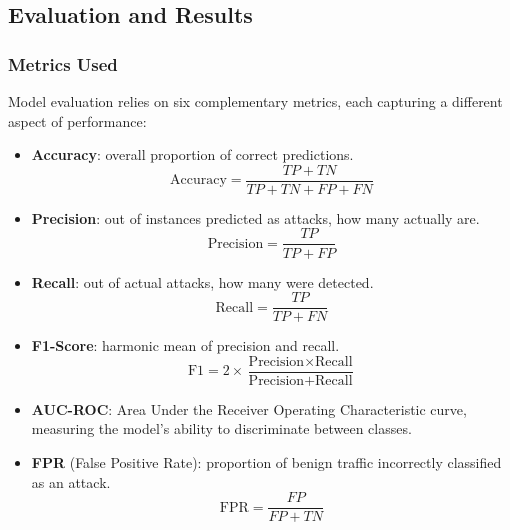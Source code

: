 \subsection{Evaluation and Results}

\subsubsection{Metrics Used}

Model evaluation relies on six complementary metrics, each capturing a different aspect of performance:

\begin{itemize}
    \item \textbf{Accuracy}: overall proportion of correct predictions.
    \begin{equation}
        \text{Accuracy} = \frac{TP + TN}{TP + TN + FP + FN}
    \end{equation}

    \item \textbf{Precision}: out of instances predicted as attacks, how many actually are.
    \begin{equation}
        \text{Precision} = \frac{TP}{TP + FP}
    \end{equation}

    \item \textbf{Recall}: out of actual attacks, how many were detected.
    \begin{equation}
        \text{Recall} = \frac{TP}{TP + FN}
    \end{equation}

    \item \textbf{F1-Score}: harmonic mean of precision and recall.
    \begin{equation}
        \text{F1} = 2 \times \frac{\text{Precision} \times \text{Recall}}{\text{Precision} + \text{Recall}}
    \end{equation}

    \item \textbf{AUC-ROC}: Area Under the Receiver Operating Characteristic curve, measuring the model's ability to discriminate between classes.

    \item \textbf{FPR} (False Positive Rate): proportion of benign traffic incorrectly classified as an attack.
    \begin{equation}
        \text{FPR} = \frac{FP}{FP + TN}
    \end{equation}
\end{itemize}

